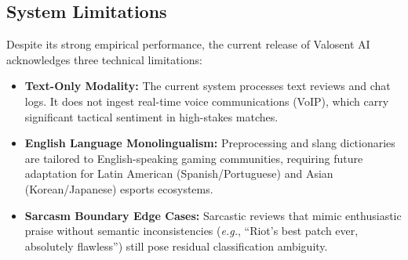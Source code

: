 \subsection{System Limitations}
Despite its strong empirical performance, the current release of Valosent AI acknowledges three technical limitations:
\begin{itemize}
    \item \textbf{Text-Only Modality:} The current system processes text reviews and chat logs. It does not ingest real-time voice communications (VoIP), which carry significant tactical sentiment in high-stakes matches.
    \item \textbf{English Language Monolingualism:} Preprocessing and slang dictionaries are tailored to English-speaking gaming communities, requiring future adaptation for Latin American (Spanish/Portuguese) and Asian (Korean/Japanese) esports ecosystems.
    \item \textbf{Sarcasm Boundary Edge Cases:} Sarcastic reviews that mimic enthusiastic praise without semantic inconsistencies (\textit{e.g.}, ``Riot's best patch ever, absolutely flawless'') still pose residual classification ambiguity.
\end{itemize}
